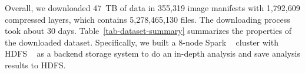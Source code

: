 %
Overall, we downloaded 47~TB of data in 355,319 image manifests with 1,792,609
compressed layers, which contains 5,278,465,130 files. 
The downloading process took about 30 days.
%
%
Table~\ref{tab-dataset-summary} summarizes the properties of the downloaded
dataset.
%
%
Specifically, we built a 8-node Spark
~\cite{xxx} 
cluster with HDFS
~\cite{xxx} 
as a backend storage system
to do an in-depth analysis and save analysis results to HDFS.

